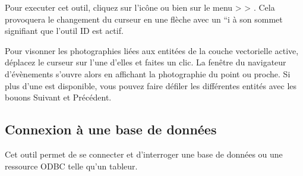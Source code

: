 
Pour executer cet outil, cliquez sur l'icône  ou bien sur le menu  >  > . Cela provoquera le changement du curseur en une flèche avec un ``i   à son sommet signifiant que l'outil ID est actif.


Pour visonner les photographies liées aux entitées de la couche vectorielle active, déplacez le curseur sur l'une d'elles et faites un clic. La fenêtre du navigateur d'évènements s'ouvre alors en affichant la photographie du point ou proche. Si plus d'une est disponible, vous pouvez faire défiler les différentes entités avec les bouons Suivant et Précédent.

\subsection{Connexion à une base de données}\label{evis_database}


Cet outil permet de se connecter et d'interroger une base de données ou une ressource ODBC telle qu'un tableur.


